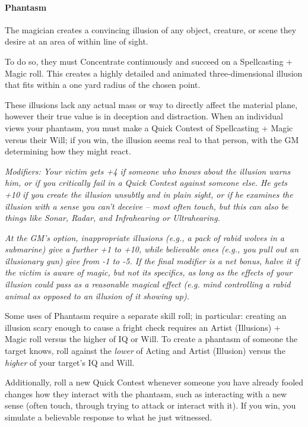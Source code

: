 \begin{multicols}{3}
	\paragraph{Phantasm}
	
	The magician creates a convincing illusion of any object, creature, or scene they desire at an area of within line of sight.
	
	To do so, they must Concentrate continuously and succeed on a Spellcasting + Magic roll. This creates a highly detailed and animated three-dimensional illusion that fits within a one yard radius of the chosen point.
	
	These illusions lack any actual mass or way to directly affect the material plane, however their true value is in deception and distraction. When an individual views your phantasm, you must make a Quick Contest of Spellcasting + Magic versus their Will; if you win, the illusion seems real to that person, with the GM determining how they might react.
	
	\textcolor{NavyBlue}{\textit{Modifiers: Your victim gets +4 if someone who knows about the illusion warns him, or if you critically fail in a Quick Contest against someone else. He gets +10 if you create the illusion unsubtly and in plain sight, or if	he examines the illusion with a sense you can’t deceive – most often touch, but this can also be things like Sonar, Radar, and Infrahearing or Ultrahearing. }}
			
	\textcolor{NavyBlue}{\textit{At the GM’s option, inappropriate illusions (e.g., a pack of rabid wolves in a submarine) give a further +1 to +10, while believable ones (e.g., you pull out an illusionary gun) give from -1 to -5. If the final modifier is a net bonus, halve it if the victim is aware of magic, but not its specifics, as long as the effects of your illusion could pass as a reasonable magical effect (e.g. mind controlling a rabid animal as opposed to an illusion of it showing up).}}
	
	Some uses of Phantasm require a separate skill roll; in particular: creating an illusion scary enough to cause a fright check requires an Artist (Illusions) + Magic roll versus the higher of IQ or Will. To create a phantasm of someone the target knows, roll against the \textit{lower} of Acting and Artist (Illusion) versus the \textit{higher} of your target's IQ and Will.
	
	Additionally, roll a new Quick Contest whenever someone you have already fooled changes how they interact with the phantasm, such as interacting with a new sense (often touch, through trying to attack or interact with it). If you win, you simulate a believable response to what he just witnessed.
	

\end{multicols}

